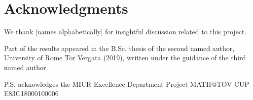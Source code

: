 
\section*{Acknowledgments}

We thank [names alphabetically] for insightful discussion related to this project.

Part of the results appeared in the B.Sc. thesis of the second named author, University of Rome Tor Vergata (2019), written under the guidance of the third named author.

P.S. acknowledges the MIUR Excellence Department Project MATH@TOV CUP E83C18000100006
